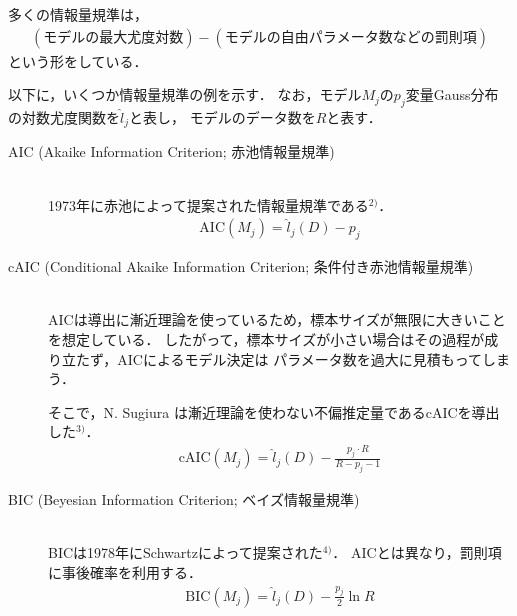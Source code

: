 多くの情報量規準は，
\begin{align*}
  (モデルの最大尤度対数) - (モデルの自由パラメータ数などの罰則項)
\end{align*}
という形をしている．

以下に，いくつか情報量規準の例を示す．
なお，モデル$M_j$の$p_j$変量Gauss分布の対数尤度関数を$\hat{l}_j$と表し，
モデルのデータ数を$R$と表す．
\begin{description}
  \item[AIC (Akaike Information Criterion; 赤池情報量規準)]~\\
    1973年に赤池によって提案された情報量規準である$^{2)}$．
    \begin{align}
      \label{eq:aic}
      \mathrm{AIC}(M_j) = \hat{l}_j(D) - p_j
    \end{align}
  \item[cAIC (Conditional Akaike Information Criterion; 条件付き赤池情報量規準)]~\\
    AICは導出に漸近理論を使っているため，標本サイズが無限に大きいことを想定している．
    したがって，標本サイズが小さい場合はその過程が成り立たず，AICによるモデル決定は
    パラメータ数を過大に見積もってしまう．

    そこで，N. Sugiura は漸近理論を使わない不偏推定量であるcAICを導出した$^{3)}$．
    \begin{align}
      \label{eq:caic}
      \mathrm{cAIC}(M_j) = \hat{l}_j(D) - \frac{p_j \cdot R}{R-p_j-1}
    \end{align}
  \item[BIC (Beyesian Information Criterion; ベイズ情報量規準)]~\\
    BICは1978年にSchwartzによって提案された$^{4)}$．
    AICとは異なり，罰則項に事後確率を利用する．
    \begin{align}
      \label{eq:bic}
      \mathrm{BIC}(M_j) = \hat{l}_j(D) - \frac{p_j}{2}\ln R
    \end{align}
\end{description}


